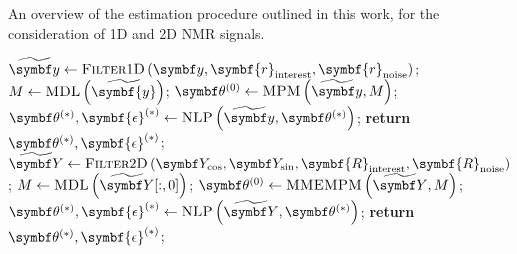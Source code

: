 \begin{algorithm}
    \begin{algorithmic}[1]
        \caption[
            An overview of the estimation procedure outlined in this work.
        ]{
            An overview of the estimation procedure outlined in this work, for
            the consideration of \ac{1D} and \ac{2D} \ac{NMR} signals.
        }
            \State $\widetilde{\by} \gets \textsc{Filter}1\textsc{D}\left(
                \by,
                \symbf{r}_{\text{interest}},
                \symbf{r}_{\text{noise}}
                \right)
            $;
                \State $M \gets \textsc{MDL}\left(\widetilde{\symbf{y}}\right)$;
            \EndIf
            \State $\bthzero \gets \textsc{MPM}\left(\widetilde{\by}, M\right)$;
            \State $\bthstar, \symbf{\epsilon}^{(*)} \gets \textsc{NLP}\left(\widetilde{\by}, \bthstar\right)$;
            \State \textbf{return} $\bthstar, \symbf{\epsilon}^{(*)}$;
        \EndProcedure
        \Statex
            \State $\widetilde{\bY} \gets \textsc{Filter}2\textsc{D}\left(
                \bY_{\cos},
                \bY_{\sin},
                \symbf{R}_{\text{interest}},
                \symbf{R}_{\text{noise}}
                \right)
            $;
                \State $M \gets \textsc{MDL}\left(\widetilde{\bY}[:, 0]\right)$;
            \EndIf
            \State $\bthzero \gets \textsc{MMEMPM}\left(\widetilde{\bY}, M\right)$;
            \State $\bthstar, \symbf{\epsilon}^{(*)} \gets \textsc{NLP}\left(\widetilde{\bY}, \bthstar\right)$;
            \State \textbf{return} $\bthstar, \symbf{\epsilon}^{(*)}$;
        \EndProcedure
    \end{algorithmic}
\end{algorithm}
